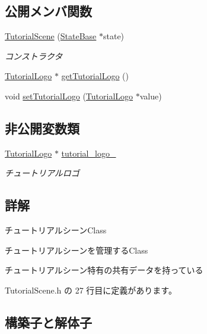 \subsection*{公開メンバ関数}
\begin{DoxyCompactItemize}
\item 
\mbox{\hyperlink{class_tutorial_scene_a90f8c010bd72aa3dae61a5294fdfbeb7}{Tutorial\+Scene}} (\mbox{\hyperlink{class_scene_base_1_1_state_base}{State\+Base}} $\ast$state)
\begin{DoxyCompactList}\small\item\em コンストラクタ \end{DoxyCompactList}\item 
\mbox{\hyperlink{class_tutorial_logo}{Tutorial\+Logo}} $\ast$ \mbox{\hyperlink{class_tutorial_scene_a2038b4fe667b7a69080a8c9c752f7fb9}{get\+Tutorial\+Logo}} ()
\item 
void \mbox{\hyperlink{class_tutorial_scene_a7c8b448ac848d4811e448acf45c5a48e}{set\+Tutorial\+Logo}} (\mbox{\hyperlink{class_tutorial_logo}{Tutorial\+Logo}} $\ast$value)
\end{DoxyCompactItemize}
\subsection*{非公開変数類}
\begin{DoxyCompactItemize}
\item 
\mbox{\hyperlink{class_tutorial_logo}{Tutorial\+Logo}} $\ast$ \mbox{\hyperlink{class_tutorial_scene_a3c2e0e47c2e6078bb7eff928d72fde2a}{tutorial\+\_\+logo\+\_\+}}
\begin{DoxyCompactList}\small\item\em チュートリアルロゴ \end{DoxyCompactList}\end{DoxyCompactItemize}


\subsection{詳解}
チュートリアルシーン\+Class 

チュートリアルシーンを管理する\+Class

チュートリアルシーン特有の共有データを持っている 

 Tutorial\+Scene.\+h の 27 行目に定義があります。



\subsection{構築子と解体子}
\mbox{\label{class_tutorial_scene_a90f8c010bd72aa3dae61a5294fdfbeb7}} 
